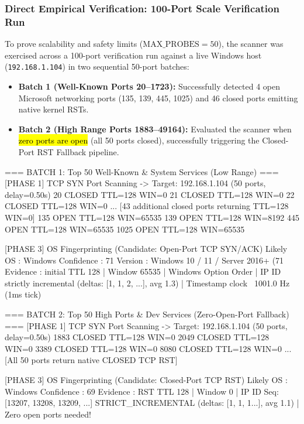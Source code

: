 \subsubsection{Direct Empirical Verification: 100-Port Scale Verification Run}
To prove scalability and safety limits ($\text{MAX\_PROBES} = 50$), the scanner was exercised
across a 100-port verification run against a live Windows host (\texttt{192.168.1.104}) in two
sequential 50-port batches:
\begin{itemize}
    \item \textbf{Batch 1 (Well-Known Ports 20--1723):} Successfully detected 4 open Microsoft
    networking ports (135, 139, 445, 1025) and 46 closed ports emitting native kernel RSTs.
    \item \textbf{Batch 2 (High Range Ports 1883--49164):} Evaluated the scanner when \hl{zero ports
    are open} (all 50 ports closed), successfully triggering the Closed-Port RST Fallback pipeline.
\end{itemize}

\begin{logbox}
=== BATCH 1: Top 50 Well-Known & System Services (Low Range) ===
[PHASE 1] TCP SYN Port Scanning  ->  Target: 192.168.1.104 (50 ports, delay=0.50s)
    20  CLOSED                         TTL=128 WIN=0
    21  CLOSED                         TTL=128 WIN=0
    22  CLOSED                         TTL=128 WIN=0
   ...  [43 additional closed ports returning TTL=128 WIN=0]
   135  OPEN                           TTL=128 WIN=65535
   139  OPEN                           TTL=128 WIN=8192
   445  OPEN                           TTL=128 WIN=65535
  1025  OPEN                           TTL=128 WIN=65535

[PHASE 3] OS Fingerprinting (Candidate: Open-Port TCP SYN/ACK)
  Likely OS  : Windows                 Confidence : 71%
  Version    : Windows 10 / 11 / Server 2016+ (71%
  Evidence   : initial TTL 128 | Window 65535 | Windows Option Order | IP ID strictly incremental (deltas: [1, 1, 2, ...], avg 1.3) | Timestamp clock ~1001.0 Hz (1ms tick)

=== BATCH 2: Top 50 High Ports & Dev Services (Zero-Open-Port Fallback) ===
[PHASE 1] TCP SYN Port Scanning  ->  Target: 192.168.1.104 (50 ports, delay=0.50s)
  1883  CLOSED   TTL=128 WIN=0      2049  CLOSED   TTL=128 WIN=0
  3389  CLOSED   TTL=128 WIN=0      8080  CLOSED   TTL=128 WIN=0
  ... [All 50 ports return native CLOSED TCP RST]

[PHASE 3] OS Fingerprinting (Candidate: Closed-Port TCP RST)
  Likely OS  : Windows                 Confidence : 69%
  Evidence   : RST TTL 128 | Window 0 | IP ID Seq: [13207, 13208, 13209, ...] STRICT_INCREMENTAL (deltas: [1, 1, 1...], avg 1.1) | Zero open ports needed!
\end{logbox}

